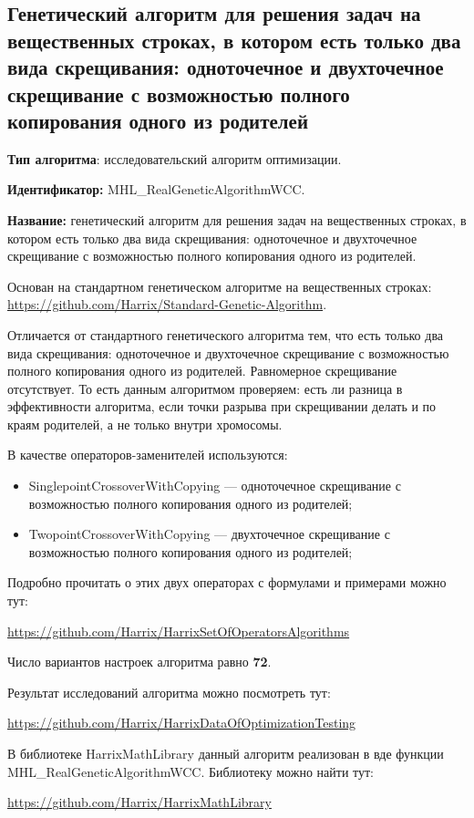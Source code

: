 \subsection{Генетический алгоритм для решения задач на вещественных строках, в котором есть только два вида скрещивания: одноточечное и двухточечное скрещивание с возможностью полного копирования одного из родителей}\label{HarrixOptimizationAlgorithms:MHL_RealGeneticAlgorithmWCC}

\textbf{Тип алгоритма}: исследовательский алгоритм оптимизации.

\textbf{Идентификатор:} MHL\_RealGeneticAlgorithmWCC.

\textbf{Название:} генетический алгоритм для решения задач на вещественных строках, в котором есть только два вида скрещивания: одноточечное и двухточечное скрещивание с возможностью полного копирования одного из родителей.

Основан на стандартном генетическом алгоритме на вещественных строках:  \href{https://github.com/Harrix/Standard-Genetic-Algorithm}{https://github.com/Harrix/Standard-Genetic-Algorithm}. 

Отличается от стандартного генетического алгоритма тем, что есть только два вида скрещивания: одноточечное и двухточечное скрещивание с возможностью полного копирования одного из родителей. Равномерное скрещивание отсутствует. То есть данным алгоритмом проверяем: есть ли разница в эффективности алгоритма, если точки разрыва при скрещивании делать и по краям родителей, а не только внутри хромосомы.

В качестве операторов-заменителей используются:
\begin{itemize}
\item SinglepointCrossoverWithCopying --- одноточечное скрещивание с возможностью полного копирования одного из родителей;
\item TwopointCrossoverWithCopying --- двухточечное скрещивание с возможностью полного копирования одного из родителей;
\end{itemize}

Подробно прочитать о этих двух операторах с формулами и примерами можно тут:

\href{https://github.com/Harrix/HarrixSetOfOperatorsAlgorithms}{https://github.com/Harrix/HarrixSetOfOperatorsAlgorithms}

Число вариантов настроек алгоритма равно \textbf{72}.

Результат исследований алгоритма можно посмотреть тут:

\href{https://github.com/Harrix/HarrixDataOfOptimizationTesting}{https://github.com/Harrix/HarrixDataOfOptimizationTesting}

В библиотеке HarrixMathLibrary данный алгоритм реализован в вде функции MHL\_RealGeneticAlgorithmWCC. Библиотеку можно найти тут:

\href{https://github.com/Harrix/HarrixMathLibrary}{https://github.com/Harrix/HarrixMathLibrary}